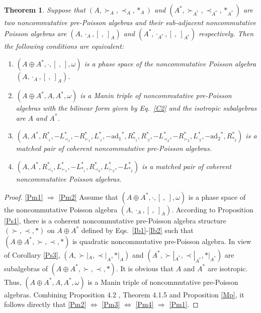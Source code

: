 \documentclass[12pt]{amsart}
\newtheorem{thm}{Theorem}[section]
\theoremstyle{definition}
\begin{document}
\begin{thm} \label{Mp1}
Suppose that $(A,\succ_{A},\prec_{A},\ast_{A})$ and $(A^{*},\succ_{A^{*}},\prec_{A^{*}},\ast_{A^{*}})$ are two 
 noncommutative pre-Poisson algebras and their sub-adjacent
noncommutative Poisson algebras are $(A,\cdot_A, [ \ , \ ]_A)$ and
 $(A^{*},\cdot_{A^{*}}, [ \ , \ ]_{A^{*}})$ respectively. Then the following conditions are equivalent:
\begin{enumerate}
\item \label{Pm1} $(A\oplus A^{*},\cdot,[ \ , \ ],\omega)$ is a phase space of the noncommutative Poisson algebra $(A,\cdot_A, [ \ , \ ]_A)$.
\item \label{Pm2} $(A\oplus A^{*},A, A^{*},\omega)$ is a Manin triple of noncommutative pre-Poisson algebras with the
bilinear form given by Eq.~\eqref{C2}
and the isotropic subalgebras are $A$ and $ A^{*}$.
\item \label{Pm3}
$(A, A^{*}, R_{\cdot_1}^{*},-L_{\prec_1}^{*},-R_{\succ_1}^{*},L_{\cdot_1}^{*},-\mathrm{ad_1}^{*},R^{*}_{\ast_1},
 R_{\cdot_2}^{*},-L_{\prec_2}^{*},-R_{\succ_2}^{*},L_{\cdot_2}^{*},-\mathrm{ad_2}^{*},R^{*}_{\ast_2})$ 
 is a matched pair of coherent noncommutative pre-Poisson algebras.
 \item \label{Pm4}
$(A, A^{*},R_{\prec_1}^{*}, L_{\succ_1}^{*},-L_{\ast_1}^{*},R_{\prec_2}^{*},L_{\succ_2}^{*},-L_{\ast_2}^{*}) $ is a matched pair of coherent 
noncommutative Poisson algebras.
\end{enumerate}
\end{thm}

\begin{proof} \eqref{Pm1} $\Longrightarrow$ \eqref{Pm2}
Assume that $(A\oplus A^{*},\cdot,[ \ , \ ],\omega)$ is a phase 
space of the noncommutative Poisson algebra $(A,\cdot_A, [ \ , \ ]_A)$.
According to Proposition \ref{Ps1}, there is a coherent noncommutative pre-Poisson algebra structure $(\succ,\prec,\ast)$
on $A\oplus A^{*}$ defined by Eqs.~\eqref{Ib1}-\eqref{Ib2} such that 
 $(A\oplus A^{*},\succ,\prec,\ast)$ is quadratic noncommutative pre-Poisson algebra.
 In view of Corollary \ref{Ps3}, $(A,\succ|_{A},\prec|_{A},\ast|_{A})$ and $(A^{*},\succ|_{A^{*}},\prec|_{A^{*}},\ast|_{A^{*}})$
are subalgebras of $(A\oplus A^{*},\succ,\prec,\ast)$.
It is obvious that $A$ and $ A^{*}$ are isotropic. Thus, $(A\oplus A^{*},A, A^{*},\omega)$ is
 a Manin triple of noncommutative pre-Poisson algebras.
 Combining Proposition 4.2 \cite{B1}, Theorem 4.1.5 \cite{B2} and Proposition \ref{Mp}, it follows directly that
\eqref{Pm2} $\Longleftrightarrow$ \eqref{Pm3} $\Longleftrightarrow$ \eqref{Pm4} $\Longrightarrow$ \eqref{Pm1}. 
\end{proof}
\end{document}
